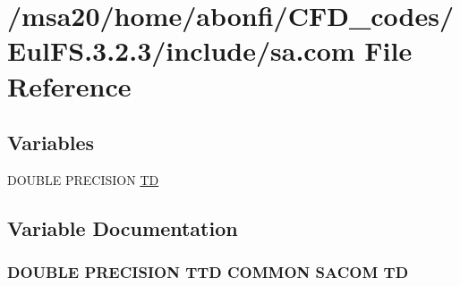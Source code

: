 \hypertarget{msa20_2home_2abonfi_2_c_f_d__codes_2_eul_f_s_83_82_83_2include_2sa_8com}{\section{/msa20/home/abonfi/\-C\-F\-D\-\_\-codes/\-Eul\-F\-S.3.2.3/include/sa.com File Reference}
\label{msa20_2home_2abonfi_2_c_f_d__codes_2_eul_f_s_83_82_83_2include_2sa_8com}
}
\subsection*{Variables}
\begin{DoxyCompactItemize}
\item 
D\-O\-U\-B\-L\-E P\-R\-E\-C\-I\-S\-I\-O\-N \hyperlink{msa20_2home_2abonfi_2_c_f_d__codes_2_eul_f_s_83_82_83_2include_2sa_8com_aaac56f2de1ace407a7ad1003554d2bff}{T\-D}
\end{DoxyCompactItemize}


\subsection{Variable Documentation}
\hypertarget{msa20_2home_2abonfi_2_c_f_d__codes_2_eul_f_s_83_82_83_2include_2sa_8com_aaac56f2de1ace407a7ad1003554d2bff}{
\subsubsection[{T\-D}]{\setlength{\rightskip}{0pt plus 5cm}D\-O\-U\-B\-L\-E P\-R\-E\-C\-I\-S\-I\-O\-N T\-T\-D C\-O\-M\-M\-O\-N S\-A\-C\-O\-M T\-D}}\label{msa20_2home_2abonfi_2_c_f_d__codes_2_eul_f_s_83_82_83_2include_2sa_8com_aaac56f2de1ace407a7ad1003554d2bff}
